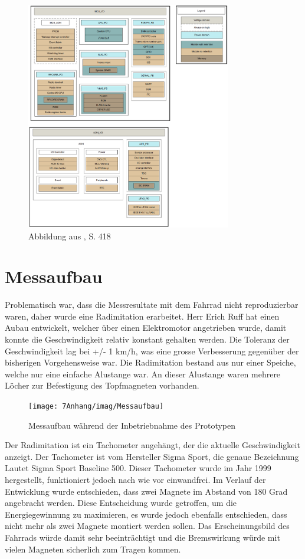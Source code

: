 \begin{figure}[h]
    \includegraphics [width=0.8\textwidth]{7Anhang/imag/powerDomain_2.png} 
     \caption{Abbildung aus \cite{Sensortag_Manual}, S. 418}
     \label{a_powerdomain}
\end{figure}

\chapter{Messaufbau}
\label{messaufbau}
Problematisch war, dass die Messresultate mit dem Fahrrad nicht reproduzierbar waren, daher wurde eine Radimitation erarbeitet. Herr Erich Ruff hat einen Aubau entwickelt, welcher über einen Elektromotor angetrieben wurde, damit konnte die Geschwindigkeit relativ konstant gehalten werden. Die Toleranz der Geschwindigkeit lag bei +/- 1 km/h, was eine grosse Verbesserung gegenüber der bisherigen Vorgehensweise war. Die Radimitation bestand aus nur einer Speiche, welche nur eine einfache Alustange war. An dieser Alustange waren mehrere Löcher zur Befestigung des Topfmagneten vorhanden.

\begin{figure}[ht]
    \texttt{[image: 7Anhang/imag/Messaufbau]}
	\caption{Messaufbau während der Inbetriebnahme des Prototypen}
	\label{messaufbau_anhang}
\end{figure}

Der Radimitation ist ein Tachometer angehängt, der die aktuelle Geschwindigkeit anzeigt. Der Tachometer ist vom Hersteller Sigma Sport, die genaue Bezeichnung Lautet Sigma Sport Baseline 500. Dieser Tachometer wurde im Jahr 1999 hergestellt, funktioniert jedoch nach wie vor einwandfrei. Im Verlauf der Entwicklung wurde entschieden, dass zwei Magnete im Abstand von 180 Grad angebracht werden. Diese Entscheidung wurde getroffen, um die Energiegewinnung zu maximieren, es wurde jedoch ebenfalls entschieden, dass nicht mehr als zwei Magnete montiert werden sollen. Das Erscheinungsbild des Fahrrads würde damit sehr beeinträchtigt und die Bremswirkung würde mit vielen Magneten sicherlich zum Tragen kommen.

